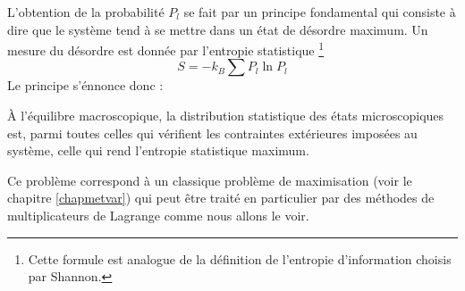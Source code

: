 \documentclass[12pt]{book}
\begin{document}
L'obtention de la probabilit\'e $P_l$ se fait par un principe
fondamental qui consiste \`a dire que le syst\`eme tend \`a se mettre
dans un \'etat de d\'esordre maximum\cite{ph:physt:Reif64,ph:physt:Diu89}. Un mesure du
d\'esordre est 
donn\'ee par l'entropie statistique \footnote{Cette formule est
analogue de la d\'efinition de l'entropie d'information choisis par Shannon\cite{ph:physt:Shannon49}.}
\begin{equation}
S=-k_B\sum P_l \ln P_l
\end{equation}
Le principe s'\'ennonce donc :
\begin{postulat}
\`A l'\'equilibre macroscopique, la distribution statistique des
\'etats microscopiques est, parmi toutes celles qui v\'erifient les
contraintes ext\'erieures impos\'ees au syst\`eme, celle qui rend
l'entropie statistique maximum.
\end{postulat}
\begin{rem}
Ce probl\`eme correspond \`a un classique probl\`eme de
maximisation (voir le chapitre \ref{chapmetvar}) qui peut \^etre
trait\'e en particulier par des 
m\'ethodes de multiplicateurs de Lagrange comme nous allons le voir.
\end{rem}
\end{document}
